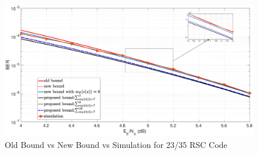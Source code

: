 
\begin{figure}[htbp]
	\centering
	\includegraphics[width=1\textwidth]{./Images/RSC_23_35_lower_weights3.eps}
	\caption{Old Bound vs New Bound vs Simulation for 23/35 RSC Code}
	\label{simFig3}
\end{figure}

%
%
%
%
%
%
%
%



